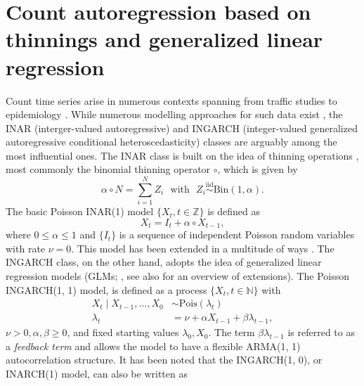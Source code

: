 \documentclass{article}
\begin{document}

\maketitle

\section{Count autoregression based on thinnings and generalized linear regression}
\label{sec:intro}

Count time series arise in numerous contexts spanning from traffic studies \cite{Quddus2008} to epidemiology \cite{Bracher2022}. While numerous modelling approaches for such data exist \cite{Davis2021}, the INAR (interger-valued autoregressive) and INGARCH (integer-valued generalized autoregressive conditional heteroscedasticity) classes are arguably among the most influential ones. The INAR class is built on the idea of thinning operations \citep{Steutel1979}, most commonly the binomial thinning operator $\circ$, which is given by
$$
\alpha \circ N = \sum_{i = 1}^N Z_i \ \ \ \text{with} \ \ \ Z_i \stackrel{\text{iid}}{\sim} \text{Bin}(1, \alpha).
$$
The basic Poisson INAR(1) model $\{X_t, t \in \mathbb{Z}\}$ \citep{McKenzie1985, Al-Osh1987} is defined as
\begin{equation}
X_t = I_t + \alpha \circ X_{t - 1},\label{eq:inar1}
\end{equation}
where $0 \leq \alpha \leq 1$ and $\{I_t\}$ is a sequence of independent Poisson random variables with rate $\nu = 0$. This model has been extended in a multitude of ways \cite{Scotto2015}. The INGARCH class, on the other hand, adopts the idea of generalized linear regression models (GLMs; \cite{Ferland2006, Fokianos2009}, see also \citep{Fokianos2016} for an overview of extensions). The Poisson INGARCH(1, 1) model, is defined as a process $\{X_t, t \in \mathbb{N}\}$ with
\begin{align}
X_t \mid X_{t - 1}, \dots, X_0 & \sim \text{Pois}(\lambda_t) \label{eq:ingarch11}\\
\lambda_t & = \nu + \alpha X_{t - 1} + \beta \lambda_{t - 1},\nonumber
\end{align}
$\nu > 0, \alpha, \beta \geq 0$, and fixed starting values $\lambda_0, X_0$. The term $\beta \lambda_{t - 1}$ is referred to as a \textit{feedback term} and allows the model to have a flexible ARMA(1, 1) autocorrelation structure.  It has been noted that the INGARCH(1, 0), or INARCH(1) model, can also be written as \citep{Weiss2015}
\end{document}
